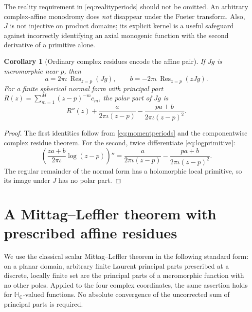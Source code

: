 \documentclass[11pt,a4paper]{article}
\numberwithin{equation}{section}
\newtheorem{corollary}[theorem]{Corollary}
\theoremstyle{definition}
\theoremstyle{remark}
\newcommand{\C}{\mathbb C}
\newcommand{\HC}{\mathbb H_{\C}}
\newcommand{\Res}{\operatorname{Res}}
\begin{document}
The reality requirement in \eqref{eq:realityperiods} should not be omitted.
An arbitrary complex-affine monodromy does \emph{not} disappear under the
Fueter transform. Also, $J$ is not injective on product domains; its explicit
kernel is a useful safeguard against incorrectly identifying an axial
monogenic function with the second derivative of a primitive alone.

\begin{corollary}[Ordinary complex residues encode the affine pair]
\label{cor:momentresidues}
If $Jg$ is meromorphic near $p$, then
\begin{equation}
 a=2\pi\iota\,\Res_{z=p}(Jg),\qquad
 b=-2\pi\iota\,\Res_{z=p}(zJg).
 \label{eq:momentresidues}
\end{equation}
For a finite spherical normal form with principal part
$R(z)=\sum_{m=1}^{M}(z-p)^{-m}c_m$, the polar part of $Jg$ is
\begin{equation}
 R''(z)+\frac{a}{2\pi\iota(z-p)}
         -\frac{pa+b}{2\pi\iota(z-p)^2}.
 \label{eq:polarH}
\end{equation}
\end{corollary}
\begin{proof}
The first identities follow from \eqref{eq:momentperiods} and the
componentwise complex residue theorem. For the second, twice differentiate
\eqref{eq:logprimitive}:
\begin{equation}
 \left(\frac{za+b}{2\pi\iota}\log(z-p)\right)''
   =\frac{a}{2\pi\iota(z-p)}
      -\frac{pa+b}{2\pi\iota(z-p)^2}.
 \label{eq:logsecond}
\end{equation}
The regular remainder of the normal form has a holomorphic local primitive,
so its image under $J$ has no polar part.
\end{proof}

\section{A Mittag--Leffler theorem with prescribed affine residues}
\label{sec:ML}

We use the classical scalar Mittag--Leffler theorem in the following standard
form: on a planar domain, arbitrary finite Laurent principal parts prescribed
at a discrete, locally finite set are the principal parts of a meromorphic
function with no other poles. Applied to the four complex coordinates, the
same assertion holds for $\HC$-valued functions. No absolute convergence
of the uncorrected sum of principal parts is required.
\end{document}
